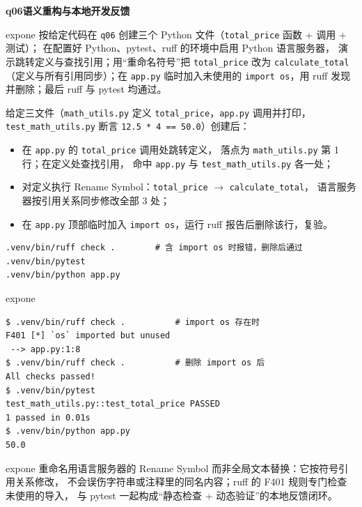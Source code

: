 \documentclass[11pt,a4paper,fontset=none]{ctexart}
\newcommand{\hwbanner}[3]{%
  \par\vspace{1.1em}
  \begin{tcolorbox}[enhanced, colback=#1!8, colframe=#1!75!black,
    boxrule=0.8pt, arc=2pt, left=7pt, right=7pt, top=4pt, bottom=4pt,
    before skip=1.1em]
    {\bfseries\color{#1!75!black}#2\qquad #3}
  \end{tcolorbox}
  \par\vspace{0.1em}\noindent\ignorespaces
}
\newcommand{\sublabel}[2]{%
  \par\vspace{0.8em}\noindent{\bfseries\color{#1!75!black}#2}\par\nobreak\vspace{0.25em}\noindent\ignorespaces
}
\begin{document}
\hwbanner{expone}{q06}{语义重构与本地开发反馈}
\begin{reqbox}{expone}
  按给定代码在 \texttt{q06} 创建三个 Python 文件（\texttt{total\_price} 函数 + 调用 + 测试）；
  在配置好 Python、pytest、ruff 的环境中启用 Python 语言服务器，
  演示跳转定义与查找引用；用“重命名符号”把 \texttt{total\_price} 改为
  \texttt{calculate\_total}（定义与所有引用同步）；在 \texttt{app.py} 临时加入未使用的
  \texttt{import os}，用 ruff 发现并删除；最后 ruff 与 pytest 均通过。
\end{reqbox}
\sublabel{expone}{\faCode\ 操作过程}
  给定三文件（\texttt{math\_utils.py} 定义 \texttt{total\_price}，\texttt{app.py}
  调用并打印，\texttt{test\_math\_utils.py} 断言 \texttt{12.5 * 4 == 50.0}）创建后：
\begin{itemize}[leftmargin=1.4em, itemsep=1pt]
  \item 在 \texttt{app.py} 的 \texttt{total\_price} 调用处跳转定义，
        落点为 \texttt{math\_utils.py} 第 1 行；在定义处查找引用，
        命中 \texttt{app.py} 与 \texttt{test\_math\_utils.py} 各一处；
  \item 对定义执行 Rename Symbol：\texttt{total\_price} $\rightarrow$ \texttt{calculate\_total}，
        语言服务器按引用关系同步修改全部 3 处；
  \item 在 \texttt{app.py} 顶部临时加入 \texttt{import os}，运行 ruff 报告后删除该行，复验。
\end{itemize}
\begin{lstlisting}[style=shell]
.venv/bin/ruff check .        # 含 import os 时报错，删除后通过
.venv/bin/pytest
.venv/bin/python app.py
\end{lstlisting}
\begin{resbox}{expone}
\begin{lstlisting}[style=output]
$ .venv/bin/ruff check .          # import os 存在时
F401 [*] `os` imported but unused
 --> app.py:1:8
$ .venv/bin/ruff check .          # 删除 import os 后
All checks passed!
$ .venv/bin/pytest
test_math_utils.py::test_total_price PASSED
1 passed in 0.01s
$ .venv/bin/python app.py
50.0
\end{lstlisting}
\end{resbox}
\begin{trapbox}{expone}
  重命名用语言服务器的 Rename Symbol 而非全局文本替换：它按符号引用关系修改，
  不会误伤字符串或注释里的同名内容；ruff 的 F401 规则专门检查未使用的导入，
  与 pytest 一起构成“静态检查 + 动态验证”的本地反馈闭环。
\end{trapbox}
\end{document}
